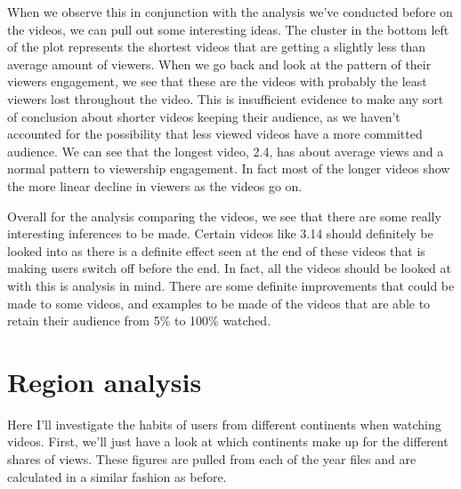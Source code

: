 \documentclass[
]{article}
\begin{document}
When we observe this in conjunction with the analysis we've conducted
before on the videos, we can pull out some interesting ideas. The
cluster in the bottom left of the plot represents the shortest videos
that are getting a slightly less than average amount of viewers. When we
go back and look at the pattern of their viewers engagement, we see that
these are the videos with probably the least viewers lost throughout the
video. This is insufficient evidence to make any sort of conclusion
about shorter videos keeping their audience, as we haven't accounted for
the possibility that less viewed videos have a more committed audience.
We can see that the longest video, 2.4, has about average views and a
normal pattern to viewership engagement. In fact most of the longer
videos show the more linear decline in viewers as the videos go on.

Overall for the analysis comparing the videos, we see that there are
some really interesting inferences to be made. Certain videos like 3.14
should definitely be looked into as there is a definite effect seen at
the end of these videos that is making users switch off before the end.
In fact, all the videos should be looked at with this is analysis in
mind. There are some definite improvements that could be made to some
videos, and examples to be made of the videos that are able to retain
their audience from 5\% to 100\% watched.

\hypertarget{region-analysis}{%
\section{Region analysis}\label{region-analysis}}

Here I'll investigate the habits of users from different continents when
watching videos. First, we'll just have a look at which continents make
up for the different shares of views. These figures are pulled from each
of the year files and are calculated in a similar fashion as before.
\end{document}
